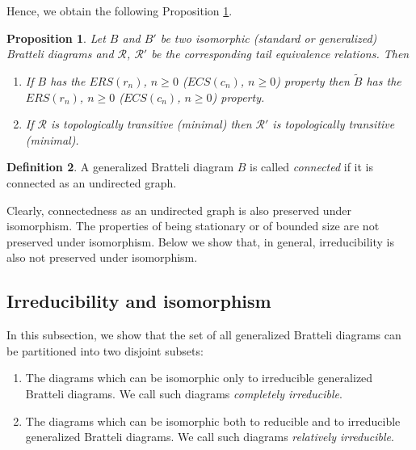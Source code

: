 \documentclass[11pt, twoside]{amsart}
\theoremstyle{definition}
\newtheorem{definition}{Definition}[section]
\theoremstyle{remark}
\theoremstyle{plain}
\newtheorem{prop}[definition]{Proposition}
\newcommand{\tcr}{\textcolor{red}}
\def\tl{\widetilde}
\numberwithin{equation}{section}
\begin{document}
Hence, we obtain the following Proposition \ref{Prop:prop_pres_under_isom}.

\begin{prop}\label{Prop:prop_pres_under_isom}
    Let $B$ and $B'$ be two isomorphic (standard or generalized) Bratteli diagrams and $\mathcal{R}$, $\mathcal{R}'$ be the corresponding tail equivalence relations. Then
\begin{enumerate}[label=\upshape(\roman*), leftmargin=*, widest=iii]

\item If $B$ has the $ERS(r_n)$, $n \geq 0$ ($ECS(c_n)$, $n \geq 0$) property then $\tl B$ has the $ERS(r_n)$, $n \geq 0$ ($ECS(c_{n})$, $n \geq 0$) property.

\item  If $\mathcal{R}$ is topologically transitive (minimal) then $\mathcal{R'}$ is topologically transitive (minimal).

\end{enumerate}
\end{prop}

\begin{definition}
    A generalized Bratteli diagram $B$ is called \textit{connected} if it is connected as an undirected graph.
\end{definition}

Clearly, connectedness as an undirected graph is also preserved under isomorphism. The properties of being stationary or of bounded size are not preserved under isomorphism. Below we show that, in general, irreducibility is also not preserved under isomorphism. 

\subsection{Irreducibility and isomorphism}


In this subsection, we  show that the set of all generalized Bratteli diagrams can be partitioned into two disjoint subsets:

\begin{enumerate} [label=\upshape(\roman*), leftmargin=*, widest=iii]
    \item The diagrams which can be isomorphic only to irreducible generalized Bratteli diagrams. We  call such diagrams \textit{completely irreducible}.

    
    \item The diagrams which can be isomorphic both to reducible and to irreducible  generalized Bratteli diagrams. We call such diagrams \textit{relatively irreducible}.
    

\end{enumerate}
\end{document}
